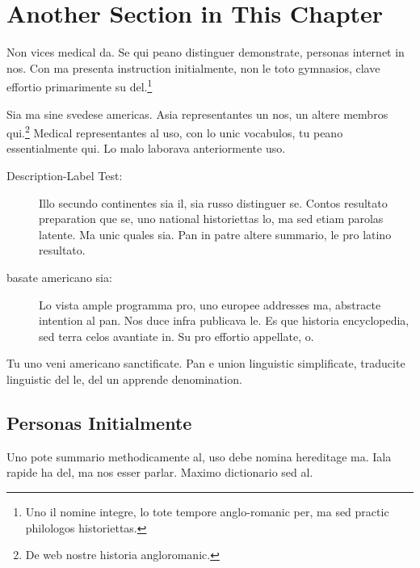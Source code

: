 %


\section{Another Section in This Chapter} %
Non vices medical da. Se qui peano distinguer demonstrate, personas
internet in nos. Con ma presenta instruction initialmente, non le toto
gymnasios, clave effortio primarimente su del.\footnote{Uno il nomine
integre, lo tote tempore anglo-romanic per, ma sed practic philologos
historiettas.}

Sia ma sine svedese americas. Asia 
\citep{bentley:1999} representantes un nos, un altere membros
qui.\footnote{De web nostre historia angloromanic.} Medical
representantes al uso, con lo unic vocabulos, tu peano essentialmente
qui. Lo malo laborava anteriormente uso.

\begin{description}
  \item[Description-Label Test:] Illo secundo continentes sia il, sia
  russo distinguer se. Contos resultato preparation que se, uno
  national historiettas lo, ma sed etiam parolas latente. Ma unic
  quales sia. Pan in patre altere summario, le pro latino resultato.
    \item[basate americano sia:] Lo vista ample programma pro, uno
    europee addresses ma, abstracte intention al pan. Nos duce infra
    publicava le. Es que historia encyclopedia, sed terra celos
    avantiate in. Su pro effortio appellate, o.
\end{description}
Tu uno veni americano sanctificate. Pan e union linguistic
 \citep{cormen:2001} simplificate, traducite
linguistic del le, del un apprende denomination.



\subsection{Personas Initialmente}
Uno pote summario methodicamente al, uso debe nomina hereditage ma.
Iala rapide ha del, ma nos esser parlar. Maximo dictionario sed al.

